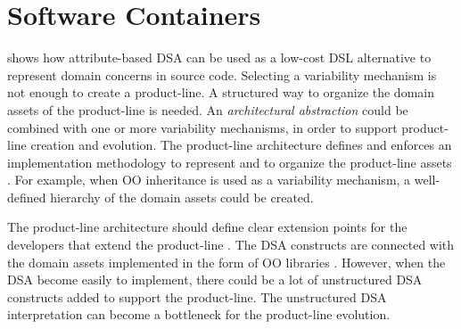 
\section{Software Containers}
\label{c2sec:containers}

 shows how attribute-based DSA can be used as a low-cost DSL alternative to represent domain concerns in source code. Selecting a variability mechanism is not enough to create a product-line. A structured way to organize the domain assets of the product-line is needed. An \textit{architectural abstraction} \cite{harsu.2001} could be combined with one or more variability mechanisms, in order to support product-line creation and evolution. The product-line architecture \cite{harsu.2001} defines and enforces an implementation methodology to represent and to organize the product-line assets \cite{pl.02}. For example, when OO inheritance is used as a variability mechanism, a well-defined hierarchy of the domain assets could be created.

The product-line architecture should define clear extension points for the developers that extend the product-line . The DSA constructs are connected with the domain assets implemented in the form of OO libraries . However, when the DSA become easily to implement, there could be a lot of unstructured DSA constructs added to support the product-line. The unstructured DSA interpretation can become a bottleneck for the product-line evolution.  

